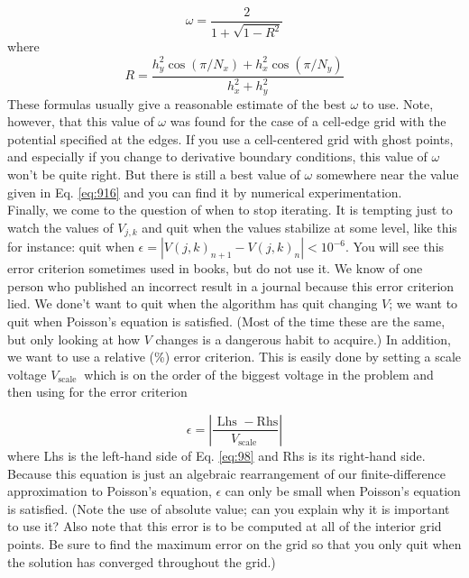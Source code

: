 \begin{equation}\label{eq:916}
\omega=\frac{2}{1+\sqrt{1-R^{2}}}
\end{equation}
where
\begin{equation}\label{eq:917}
R=\frac{h_{y}^{2} \cos \left(\pi / N_{x}\right)+h_{x}^{2} \cos \left(\pi / N_{y}\right)}{h_{x}^{2}+h_{y}^{2}}
\end{equation}
These formulas usually give a reasonable estimate of the best $\omega$ to use. Note,
however, that this value of $\omega$ was found for the case of a cell-edge grid with the
potential specified at the edges. If you use a cell-centered grid with ghost points,
and especially if you change to derivative boundary conditions, this value of $\omega$
won\rq t be quite right. But there is still a best value of $\omega$ somewhere near the value
given in Eq. \ref{eq:916} and you can find it by numerical experimentation. \\ 
Finally, we come to the question of when to stop iterating. It is tempting just to watch the values of $V_{j, k}$ and quit when the values stabilize at some level, like this for instance: quit when $\epsilon=\left|V(j, k)_{n+1}-V(j, k)_{n}\right|<10^{-6}$. You will see this error criterion sometimes used in books, but do not use it. We know of one person who published an incorrect result in a journal because this error criterion lied. We done\rq t want to quit when the algorithm has quit changing $V$; we want to quit when Poisson\rq s equation is satisfied. (Most of the time these are the same, but only looking at how $V$ changes is a dangerous habit to acquire.) In addition, we want to use a relative (\%) error criterion. This is easily done by setting a scale voltage $V_{\text {scale }}$ which is on the order of the biggest voltage in the problem and then using for the error criterion

\begin{equation}\label{eq:918}
\epsilon=\left|\frac{\text { Lhs }-\mathrm{Rhs}}{V_{\text {scale }}}\right|
\end{equation}
where Lhs is the left-hand side of Eq. \ref{eq:98} and Rhs is its right-hand side. Because this equation is just an algebraic rearrangement of our finite-difference approximation to Poisson\rq s equation, $\epsilon$ can only be small when Poisson\rq s equation is satisfied. (Note the use of absolute value; can you explain why it is important to use it? Also note that this error is to be computed at all of the interior grid points. Be sure to find the maximum error on the grid so that you only quit when the solution has converged throughout the grid.)\\

